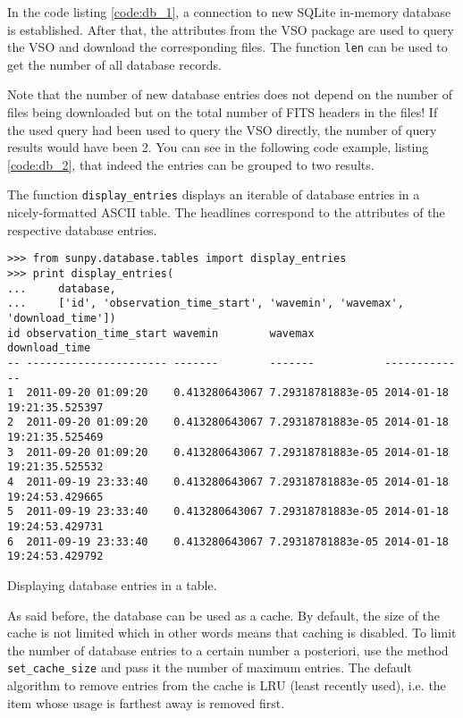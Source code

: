 In the code listing \ref{code:db_1}, a connection to new SQLite in-memory
database is established. After that, the attributes from the \textsc{VSO}
package are used to query the \textsc{VSO} and download the corresponding
files. The function \texttt{len} can be used to get the number of all database
records.

Note that the number of new database entries does not depend on the
number of files being downloaded but on the total number of \textsc{FITS}
headers in the files! If the used query had been used to query the \textsc{VSO}
directly, the number of query results would have been 2. You can see in the
following code example, listing \ref{code:db_2}, that indeed the entries can
be grouped to two results.

The function \texttt{display\_entries} displays an iterable of database entries
in a nicely-formatted \textsc{ASCII} table. The headlines correspond to the
attributes of the respective database entries.

\begin{listing}
\begin{verbatim}
>>> from sunpy.database.tables import display_entries
>>> print display_entries(
...     database,
...     ['id', 'observation_time_start', 'wavemin', 'wavemax', 'download_time'])
id observation_time_start wavemin        wavemax           download_time             
-- ---------------------- -------        -------           -------------             
1  2011-09-20 01:09:20    0.413280643067 7.29318781883e-05 2014-01-18 19:21:35.525397
2  2011-09-20 01:09:20    0.413280643067 7.29318781883e-05 2014-01-18 19:21:35.525469
3  2011-09-20 01:09:20    0.413280643067 7.29318781883e-05 2014-01-18 19:21:35.525532
4  2011-09-19 23:33:40    0.413280643067 7.29318781883e-05 2014-01-18 19:24:53.429665
5  2011-09-19 23:33:40    0.413280643067 7.29318781883e-05 2014-01-18 19:24:53.429731
6  2011-09-19 23:33:40    0.413280643067 7.29318781883e-05 2014-01-18 19:24:53.429792
\end{verbatim}
\caption{Displaying database entries in a table.}
\label{code:db_2}
\end{listing}

As said before, the database can be used as a cache. By default, the size of
the cache is not limited which in other words means that caching is disabled.
To limit the number of database entries to a certain number a posteriori, use
the method \texttt{set\_cache\_size} and pass it the number of maximum entries.
The default algorithm to remove entries from the cache is \textsc{LRU}
(least recently used), i.e. the item whose usage is farthest away is removed
first.  %

